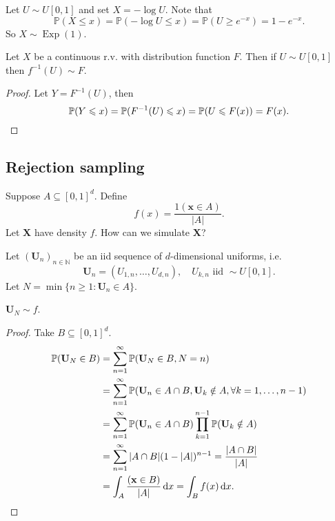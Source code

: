 \begin{example}
    Let $ U \sim U[0,1] $ and set $ X=-\log U $. Note that 
    \[
        \mathbb{P}(X \leqslant x)=\mathbb{P}(-\log U \leqslant x)=\mathbb{P}\left(U \geqslant e^{-x}\right)=1-e^{-x} .
    \]
    So $ X \sim \operatorname{Exp}(1) $.
\end{example}

\begin{theorem}
    Let $X$ be a continuous r.v. with distribution function $F$. Then if $ U \sim U[0,1] $ then $ f^{-1}(U) \sim F $.
\end{theorem}
\begin{proof}
    Let $ Y=F^{-1}(U) $, then 
    \[
        \mathbb{P}(Y\le x) = \mathbb{P}(F^{-1}(U)\le x) = \mathbb{P}(U \le F(x)) = F(x).\qedhere
    \]
\end{proof}

\subsection{Rejection sampling}

Suppose $ A \subseteq [0,1]^d $. Define
\[
    f(x) = \frac{1(\mathbf{x}\in A)}{|A|}.
\]
Let $ \mathbf{X} $ have density $f$. How can we simulate $\mathbf{X}$?

Let $ (\mathbf{U}_n)_{n\in \mathbb{N}} $ be an iid sequence of $d$-dimensional uniforms, i.e. 
\[
    \mathbf{U}_n = (U_{1,n},\dots,U_{d,n}),\quad U_{k,n} \text{ iid } \sim U[0,1].
\]
Let $ N= \min \{n\ge 1: \mathbf{U}_n\in A\} $.

\begin{claim}
    $ \mathbf{U}_N \sim f $.
\end{claim}
\begin{proof}
    Take $ B \subseteq [0,1]^d $.
    \begin{align*}
        \mathbb{P}(\mathbf{U}_N\in B) &= \sum_{n=1}^{\infty }\mathbb{P}(\mathbf{U}_N\in B,N=n)\\ 
        &= \sum_{n=1}^{\infty}\mathbb{P}(\mathbf{U}_n\in A \cap B,\mathbf{U}_{k}\notin A,\forall k=1,\dots,n-1)\\ 
        &= \sum_{n=1}^{\infty}\mathbb{P}(\mathbf{U}_n\in A\cap B)\prod_{k=1}^{n-1}\mathbb{P}(\mathbf{U}_k\notin A)\\ 
        &= \sum_{n=1}^{\infty}|A \cap B| (1-|A|)^{n-1} = \frac{|A\cap B|}{|A|}\\ 
        &= \int_{A} \frac{(\mathbf{x}\in B)}{|A|} \,\mathrm{d}x = \int_{B}f(x) \,\mathrm{d}x.\qedhere
    \end{align*}    
\end{proof}

